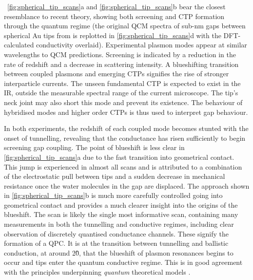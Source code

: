 \documentclass[a4paper, 11pt]{article}
\begin{document}
\figurenames~\ref{fig:spherical_tip_scans}a and \ref{fig:spherical_tip_scans}b bear the closest resemblance to recent theory, showing both screening and CTP formation through the quantum regime (the original QCM spectra of sub-nm gaps between spherical Au tips from \cite{savage2012} is replotted in \autoref{fig:spherical_tip_scans}d with the DFT-calculated conductivity overlaid). Experimental plasmon modes appear at similar wavelengths to QCM predictions. Screening is indicated by a reduction in the rate of redshift and a decrease in scattering intensity. A blueshifting transition between coupled plasmons and emerging CTPs signifies the rise of stronger interparticle currents. The unseen fundamental CTP is expected to exist in the IR, outside the measurable spectral range of the current microscope. The tip's neck joint may also short this mode and prevent its existence. The behaviour of hybridised modes and higher order CTPs is thus used to interpret gap behaviour.

In both experiments, the redshift of each coupled mode becomes stunted with the onset of tunnelling, revealing that the conductance has risen sufficiently to begin screening gap coupling. The point of blueshift is less clear in \autoref{fig:spherical_tip_scans}a due to the fast transition into geometrical contact. This jump is experienced in almost all scans and is attributed to a combination of the electrostatic pull between tips and a sudden decrease in mechanical resistance once the water molecules in the gap are displaced. The approach shown in \autoref{fig:spherical_tip_scans}b is much more carefully controlled going into geometrical contact and provides a much clearer insight into the origins of the blueshift. The scan is likely the single most informative scan, containing many measurements in both the tunnelling and conductive regimes, including clear observation of discretely quantised conductance channels. These signify the formation of a QPC. It is at the transition between tunnelling and ballistic conduction, at around 2\G0, that the blueshift of plasmon resonances begins to occur and tips enter the quantum conductive regime. This is in good agreement with the principles underpinning \emph{quantum} theoretical models \cite{zuloaga2009}.
\end{document}
